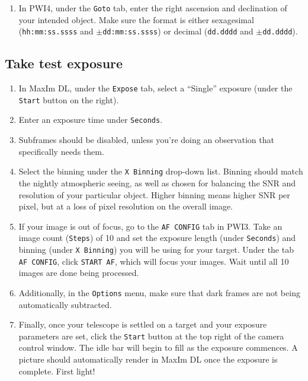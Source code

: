 \documentclass{article}
\begin{document}
	\begin{enumerate}
		
		\item In PWI4, under the \texttt{Goto} tab, enter the right ascension and declination of your intended object. Make sure the format is either sexagesimal (\texttt{hh:mm:ss.ssss} and \texttt{$\pm$dd:mm:ss.ssss}) or decimal (\texttt{dd.dddd} and \texttt{$\pm$dd.dddd}).
		
	\end{enumerate}
	
	\subsection{Take test exposure}
	\label{sec:take-test-exposure}
	
	\begin{enumerate}
		
		\item In MaxIm DL, under the \texttt{Expose} tab, select a ``Single'' exposure (under the \texttt{Start} button on the right).
		
		\item Enter an exposure time under \texttt{Seconds}.
		
		\item Subframes should be disabled, unless you're doing an observation that specifically needs them.
		
		\item Select the binning under the \texttt{X Binning} drop-down list. Binning should match the nightly atmospheric seeing, as well as chosen for balancing the SNR and resolution of your particular object. Higher binning means higher SNR per pixel, but at a loss of pixel resolution on the overall image.
		
		\item If your image is out of focus, go to the \texttt{AF CONFIG} tab in PWI3. Take an image count (\texttt{Steps}) of 10 and set the exposure length (under \texttt{Seconds}) and binning (under \texttt{X Binning}) you will be using for your target. Under the tab \texttt{AF CONFIG}, click \texttt{START AF}, which will focus your images. Wait until all 10 images are done being processed.
		
		\item Additionally, in the \texttt{Options} menu, make sure that dark frames are not being automatically subtracted.
		
		\item Finally, once your telescope is settled on a target and your exposure parameters are set, click the \texttt{Start} button at the top right of the camera control window. The idle bar will begin to fill as the exposure commences. A picture should automatically render in MaxIm DL once the exposure is complete. First light!
		

\end{enumerate}
\end{document}
